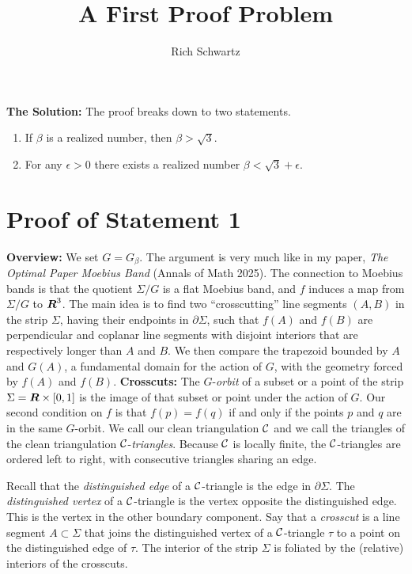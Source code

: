 \documentclass[12pt]{article}
\title{A First Proof Problem}
\author{Rich Schwartz}
\def\R{\mbox{\boldmath{$R$}}}%
\begin{document}
\noindent
{\bf The Solution:\/}
\newline
\newline
The proof breaks down to two statements.

\begin{enumerate}
\item If $\beta$ is a realized number, then
  $\beta>\sqrt 3$. 
    \item For any $\epsilon>0$ there exists a
  realized number $\beta<\sqrt 3+\epsilon$.
\end{enumerate}

\section{Proof of Statement 1}

{\bf Overview:\/}
We set $G=G_{\beta}$.
The argument is very much like in my paper,
{\it The Optimal Paper Moebius Band\/} (Annals of Math 2025). 
  The connection to
Moebius bands is that the quotient $\Sigma/G$ is a flat
Moebius band, and $f$ induces a map from
$\Sigma/G$ to $\R^3$.
  The main idea is to find two ``crosscutting''
  line segments $(A,B)$ in the strip $\Sigma$,
  having their endpoints in $\partial \Sigma$,
  such that $f(A)$ and $f(B)$ are perpendicular and coplanar line
  segments with disjoint interiors
  that are respectively longer than $A$ and $B$.
  We then compare
  the trapezoid bounded by $A$ and $G(A)$,
  a fundamental domain for the action of $G$,
  with the geometry forced by $f(A)$ and $f(B)$.
 \newline
 \newline
 {\bf Crosscuts:\/}
The $G$-{\it orbit\/} of a subset or a point of the strip
$\Sigma=\R \times [0,1]$
 is the image of that subset or point under
 the action of $G$.  Our second condition on $f$ is
 that $f(p)=f(q)$ if and only if the points $p$ and $q$ are
 in the same $G$-orbit.
 We call our clean triangulation
 $\cal C$ and we call the triangles of the clean triangulation
 ${\cal C\/}$-{\it triangles\/}.   Because $\cal C$ is
  locally finite, the
 ${\cal C\/}$-triangles are
 ordered left to right, with consecutive triangles
 sharing an edge.

 Recall that the {\it distinguished edge\/} of a ${\cal C\/}$-triangle
 is the edge in $\partial \Sigma$.
The {\it distinguished vertex\/} of a ${\cal C\/}$-triangle is
the vertex opposite the distinguished edge.  This is the vertex
in the other boundary component.
Say that a {\it crosscut\/} is a line segment $A \subset \Sigma$ that
joins the distinguished vertex of a ${\cal C\/}$-triangle $\tau$
to a point on the distinguished edge of $\tau$.
The interior of the strip $\Sigma$ is foliated by the (relative) interiors
of the crosscuts.
\end{document}
